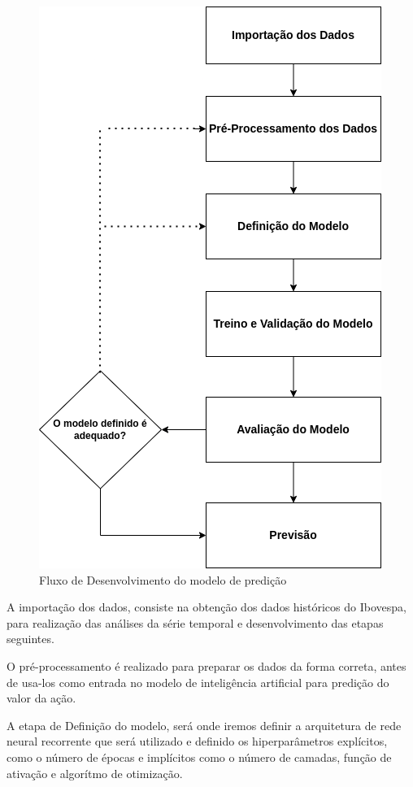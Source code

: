 \begin{figure}[H]
	\centering
	\label{Fluxo algoritmo}
		\includegraphics[keepaspectratio=true,scale=0.7]{figuras/diagrama_fluxo_desenv.png}
	\caption{Fluxo de Desenvolvimento do modelo de predição }
\end{figure}

A importação dos dados, consiste na obtenção dos dados históricos do Ibovespa, para realização das análises da série temporal e desenvolvimento das etapas seguintes.

O pré-processamento é realizado para preparar os dados da forma correta, antes de usa-los como entrada no modelo de inteligência artificial para predição do valor da ação.

A etapa de Definição do modelo, será onde iremos definir a arquitetura de rede neural recorrente que será  utilizado e definido os hiperparâmetros explícitos, como o número de épocas e implícitos como o número de camadas, função de ativação e algorítmo de otimização.


